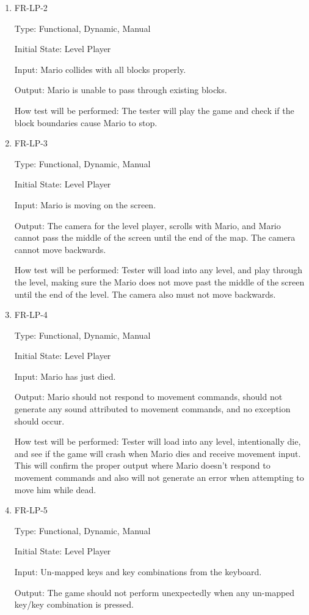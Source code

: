 \documentclass[12pt, titlepage]{article}
\begin{document}
\begin{enumerate}
\item{FR-LP-2}

Type: Functional, Dynamic, Manual

Initial State: Level Player

Input: Mario collides with all blocks properly.

Output: Mario is unable to pass through existing blocks.

How test will be performed: The tester will play the game and check if the block boundaries cause Mario to stop.

\item{FR-LP-3}

Type: Functional, Dynamic, Manual

Initial State: Level Player

Input: Mario is moving on the screen.

Output: The camera for the level player, scrolls with Mario, and Mario cannot pass the middle of the screen until the end of the map. The camera cannot move backwards.

How test will be performed: Tester will load into any level, and play through the level, making sure the Mario does not move past the middle of the screen until the end of the level. The camera also must not move backwards.

\color{red}
\item{FR-LP-4}

Type: Functional, Dynamic, Manual

Initial State: Level Player

Input: Mario has just died.

Output: Mario should not respond to movement commands, should not generate any sound attributed to movement commands, and no exception should occur.

How test will be performed: Tester will load into any level, intentionally die, and see if the game will crash when Mario dies and receive movement input. This will confirm the proper output where Mario doesn't respond to movement commands and also will not generate an error when attempting to move him while dead.

\item{FR-LP-5}

Type: Functional, Dynamic, Manual

Initial State: Level Player

Input: Un-mapped keys and key combinations from the keyboard.

Output: The game should not perform unexpectedly when any un-mapped key/key combination is pressed.


\end{enumerate}
\end{document}
